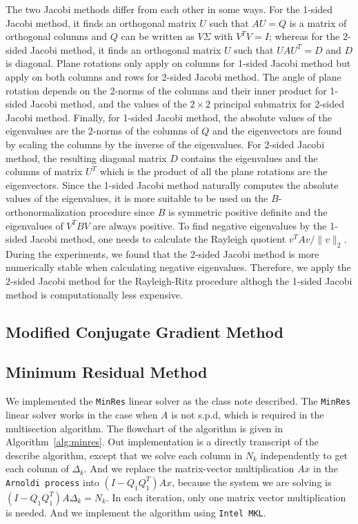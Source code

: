 The two Jacobi methods differ from each other in some ways. For the 1-sided Jacobi method, it finds an orthogonal
matrix $U$ such that $A U = Q$ is a matrix of orthogonal columns and $Q$ can be written as $V \Sigma$ with
$V^T V = I$; whereas for the 2-sided Jacobi method, it finds an orthogonal matrix $U$ such that $UAU^T = D$ and
$D$ is diagonal. Plane rotations only apply on columns for 1-sided Jacobi method but apply on both columns and rows
for 2-sided Jacobi method. The angle of plane rotation depends on the 2-norms of the columns and their inner
product for 1-sided Jacobi method, and the values of the $2 \times 2$ principal submatrix for 2-sided Jacobi method.
Finally, for 1-sided Jacobi method, the absolute values of the eigenvalues are the 2-norms of the columns of $Q$ and
the eigenvectors are found by scaling the columns by the inverse of the eigenvalues. For 2-sided Jacobi method, the
resulting diagonal matrix $D$ contains the eigenvalues and the columns of matrix $U^T$ which is the product of all
the plane rotations are the eigenvectors. Since the 1-sided Jacobi method naturally computes the absolute values of
the eigenvalues, it is more suitable to be used on the $B$-orthonormalization procedure since $B$ is symmetric
positive definite and the eigenvalues of $V^T B V$ are always positive. To find negative eigenvalues by the 1-sided
Jacobi method, one needs to calculate the Rayleigh quotient $v^T A v / \|v\|_2$. During the experiments, we found
that the 2-sided Jacobi method is more numerically stable when calculating negative eigenvalues. Therefore, we
apply the 2-sided Jacobi method for the Rayleigh-Ritz procedure althogh the 1-sided Jacobi method is computationally
less expensive.

\subsection{Modified Conjugate Gradient Method}

\subsection{Minimum Residual Method}
We implemented the {\tt MinRes} linear solver as the class note described. The {\tt MinRes} linear solver works in the case when $A$ is not s.p.d, which is required in the multisection algorithm.  The flowchart of the algorithm is given in Algorithm~\ref{alg:minres}. Out implementation is a directly transcript of the describe algorithm, except that we solve each column in $N_k$ independently to get each column of $\Delta_k$. And we replace the matrix-vector multiplication $Ax$ in the {\tt Arnoldi process} into $(I-Q_1 Q_1^T)Ax$, because the system we are solving is $(I-Q_1 Q_1^T)A \Delta_k = N_k$. In each iteration, only one matrix vector multiplication is needed. And we implement the algorithm using {\tt Intel MKL}.

